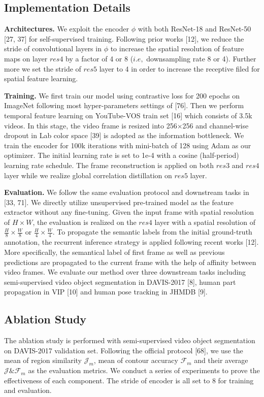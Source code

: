 \documentclass{article}
\begin{document}
\subsection{Implementation Details}
\textbf{Architectures.} We exploit the encoder $\phi$ with both ResNet-18 and ResNet-50 [27, 37] for self-supervised training. Following prior works [12], we reduce the stride of convolutional layers in $\phi$ to increase the spatial resolution of feature maps on layer $res4$  by a factor of 4 or 8 ($i.e,$ downsampling rate 8 or 4). 
Further more we set the stride of $res5$ layer to 4 in order to increase the receptive filed for spatial feature learning.

\textbf{Training.}
We first train our model using contrastive loss for 200 epochs on ImageNet following most hyper-parameters settings of [76]. Then we perform temporal feature learning on YouTube-VOS train set [16] which consists of 3.5k videos. In this stage, the video frame is resized into 256$\times$256 and channel-wise dropout in Lab color space [39] is adopted as the information bottleneck. We train the encoder for 100k iterations with mini-batch of 128  using Adam as our optimizer. The initial learning rate is set to 1e-4 with a cosine (half-period) learning rate schedule. The frame reconstruction is applied on both $res3$ and $res4$ layer while we realize global correlation distillation on $res5$ layer.

\textbf{Evaluation.}
We follow the same evaluation protocol and downstream tasks in [33, 71]. We directly utilize unsupervised pre-trained model as the feature extractor without any fine-tuning.  Given the input frame with  spatial resolution of $H\times W$, the evaluation is realized on the $res4$ layer with a spatial resolution of $\frac{H}{8} \times \frac{W}{8}$ or $\frac{H}{4} \times \frac{W}{4}$. To propagate the semantic labels from the initial ground-truth annotation, the recurrent inference strategy is applied following recent works [12]. More specifically,  the semantical label of first frame as well as previous predictions are propagated to the current frame with the help of affinity between video frames. We evaluate our method over three downstream tasks including semi-supervised video object segmentation in DAVIS-2017 [8], human part propagation in VIP [10] and human pose tracking in JHMDB [9].

\subsection{Ablation Study}
The ablation study is performed with semi-supervised video object segmentation on DAVIS-2017 validation set. Following the official protocol [68], we use the mean of region similarity $\mathcal{J}_m$, mean of contour accuracy $\mathcal{F}_m$ and their average $\mathcal{J} \& \mathcal{F}_m$ as the evaluation metrics. We conduct a series of experiments to prove the effectiveness of each  component. The stride of encoder is all set to 8 for training and evaluation.
\end{document}
